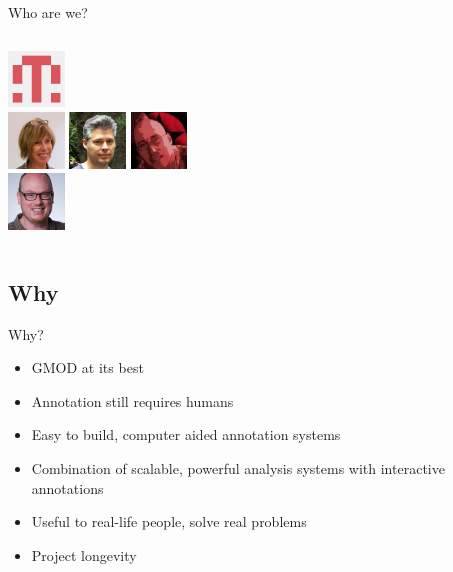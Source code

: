 \documentclass[12pt]{phage3slides} %
\begin{document}
\begin{frame}{Who are we?}
\begin{columns}
\begin{column}{0.48\textwidth}
            \includegraphics[width=1.5cm]{people/moffmade} \\
            \includegraphics[width=1.5cm]{people/selewis}
            \includegraphics[width=1.5cm]{people/nathandunn}
            \includegraphics[width=1.5cm]{people/pvanheus} \\
            \includegraphics[width=1.5cm]{people/tseemann}
        \end{column}
    \end{columns}
\end{frame}

\subsection{Why}
\begin{frame}{Why?}
    \begin{itemize}
        \item GMOD at its best
        \item Annotation still requires humans
        \item Easy to build, computer aided annotation systems
        \item Combination of scalable, powerful analysis systems with interactive annotations
        \item Useful to real-life people, solve real problems
        \item Project longevity
    \end{itemize}
\end{frame}
\end{document}

